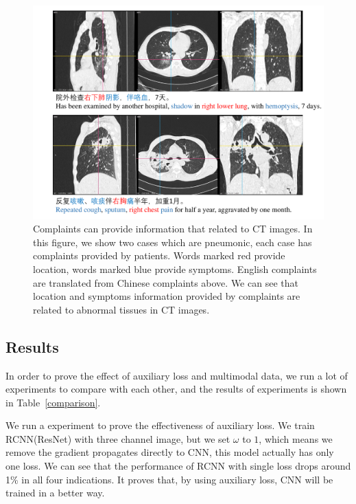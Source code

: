 \documentclass[journal]{IEEEtran}
\begin{document}
\begin{figure}[t]
\centerline{\includegraphics[width=180mm]{txtpic.pdf}}
\vspace{-0cm}
\caption{Complaints can provide information that related to CT images. In this figure, we show two cases which are pneumonic, each case has complaints provided by patients. Words marked red provide location, words marked blue provide symptoms. English complaints are translated from Chinese complaints above. We can see that location and symptoms information provided by complaints are related to abnormal tissues in CT images.}
\vspace{-0cm}
\label{txtpic}
\end{figure}

\subsection{Results}
\label{results}
In order to prove the effect of auxiliary loss and multimodal data, we run a lot of experiments to compare with each other, and the results of experiments is shown in Table~\ref{comparison}.

We run a experiment to prove the effectiveness of auxiliary loss. We train RCNN(ResNet) with three channel image, but we set $\omega$ to $1$, which means we remove the gradient propagates directly to CNN, this model actually has only one loss. We can see that the performance of RCNN with single loss drops around 1\% in all four indications. It proves that, by using auxiliary loss, CNN will be trained in a better way. 
\end{document}
